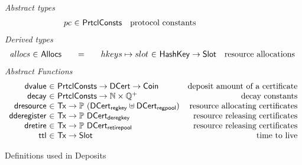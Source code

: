 \documentclass[11pt,a4paper]{article}
\newcommand{\Tx}{\type{Tx}}
\newcommand{\Coin}{\type{Coin}}
\newcommand{\PrtclConsts}{\type{PrtclConsts}}
\newcommand{\Slot}{\type{Slot}}
\newcommand{\Allocs}{\type{Allocs}}
\newcommand{\DCert}{\type{DCert}}
\newcommand{\DCertRegKey}{\type{DCert_{regkey}}}
\newcommand{\DCertDeRegKey}{\type{DCert_{deregkey}}}
\newcommand{\DCertRegPool}{\type{DCert_{regpool}}}
\newcommand{\DCertRetirePool}{\type{DCert_{retirepool}}}
\newcommand{\HashKey}{\type{HashKey}}
\theoremstyle{definition}
\theoremstyle{definition}
\begin{document}
\begin{figure*}
  \emph{Abstract types}
  \begin{equation*}
    \begin{array}{r@{~\in~}lr}
      pc & \PrtclConsts & \text{protocol constants}
    \end{array}
  \end{equation*}
  \emph{Derived types}
  \begin{equation*}
    \begin{array}{r@{~\in~}l@{\qquad=\qquad}r@{~\in~}lr}
      \var{allocs}
      & \Allocs
      & hkeys \mapsto slot
      & \HashKey \to \Slot
      & \text{resource allocations}
    \end{array}
  \end{equation*}
  \emph{Abstract Functions}
  \begin{equation*}
    \begin{array}{r@{~\in~}lr}
      \fun{dvalue} & \PrtclConsts \to \DCert \to \Coin
        & \text{deposit amount of a certificate}\\

      \fun{decay} & \PrtclConsts \to \mathbb{N}\times\mathbb{Q}^{+}
        & \text{decay constants}\\

      \fun{dresource} & \Tx \to \powerset{(\DCertRegKey \uniondistinct \DCertRegPool)}
        & \text{resource allocating certificates}\\

      \fun{dderegister} & \Tx \to \powerset{\DCertDeRegKey}
        & \text{resource releasing certificates}\\

      \fun{dretire} & \Tx \to \powerset{\DCertRetirePool}
        & \text{resource releasing certificates}\\

      \fun{ttl} & \Tx \to \Slot
        & \text{time to live}\\
    \end{array}
  \end{equation*}
  \caption{Definitions used in Deposits}
  \label{fig:defs:deposits}
\end{figure*}
\end{document}
